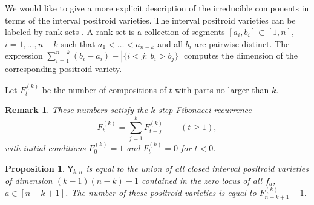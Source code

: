 \documentclass[11pt]{amsart}
\numberwithin{equation}{section}
\newtheorem{prop}[thm]{Proposition}
\newtheorem{rem}[thm]{Remark}
\begin{document}
We would like to give a more explicit description of the irreducible components
in terms of the interval positroid varieties. 
The interval positroid varieties can be labeled by rank sets \cite{Paw18,KL14}.
A rank set is a collection of segments $[a_i,b_i]\subset [1,n]$, $i=1,\dots,n-k$ 
such that $a_1<\dots <a_{n-k}$ and all $b_i$ are pairwise distinct.
The expression $\sum_{i=1}^{n-k} (b_i-a_i) -  |\{i<j:\ b_i>b_j\}|$ computes the dimension of the corresponding positroid variety.     



Let $F^{(k)}_t$ be the number of compositions of $t$
with parts no larger than $k$.
\begin{rem}
These numbers satisfy the $k$-step Fibonacci recurrence
\[
F_t^{(k)}=\sum_{j=1}^{k}F_{t-j}^{(k)}
\qquad (t\ge 1),
\]
with initial conditions
$F_0^{(k)}=1$ and $F_t^{(k)}=0$ for $t<0$.
\end{rem}





\begin{prop}
${\mathsf Y}_{k,n}$ is equal to the union of all closed interval positroid varieties
of dimension $(k-1)(n-k)-1$ contained in the zero locus of all $f_a$, $a\in [n-k+1]$.
The number of these positroid varieties is equal to $F^{(k)}_{n-k+1}-1$.
\end{prop}
\end{document}

